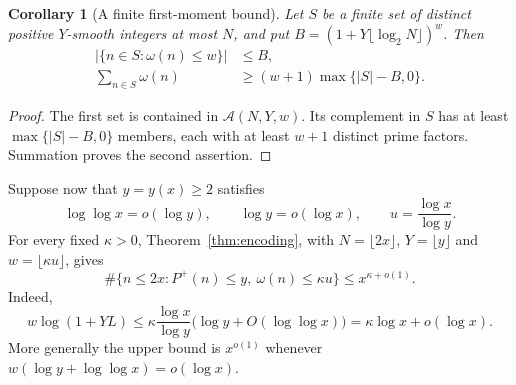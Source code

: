 \documentclass[11pt]{amsart}
\newtheorem{corollary}[theorem]{Corollary}
\theoremstyle{definition}
\theoremstyle{remark}
\newcommand{\loglog}{\log\log}
\begin{document}
\begin{corollary}[A finite first-moment bound]\label{cor:moment}
Let $S$ be a finite set of distinct positive $Y$-smooth integers at most
$N$, and put $B=(1+Y\lfloor\log_2N\rfloor)^w$. Then
\begin{align}
 |\{n\in S:\omega(n)\le w\}|&\le B,\label{eq:lowcount}\\
 \sum_{n\in S}\omega(n)&\ge(w+1)\max\{|S|-B,0\}.
 \label{eq:momentfinite}
\end{align}
\end{corollary}
\begin{proof}
The first set is contained in $\mathcal A(N,Y,w)$. Its complement in $S$
has at least $\max\{|S|-B,0\}$ members, each with at least $w+1$ distinct
prime factors. Summation proves the second assertion.
\end{proof}

Suppose now that $y=y(x)\ge2$ satisfies
\begin{equation}\label{eq:yscale}
 \loglog x=o(\log y),\qquad \log y=o(\log x),
 \qquad u=\frac{\log x}{\log y}.
\end{equation}
For every fixed $\kappa>0$, Theorem~\ref{thm:encoding}, with
$N=\lfloor2x\rfloor$, $Y=\lfloor y\rfloor$ and
$w=\lfloor\kappa u\rfloor$, gives
\begin{equation}\label{eq:global-low}
 \#\{n\le2x:P^+(n)\le y,\ \omega(n)\le\kappa u\}
 \le x^{\kappa+o(1)}.
\end{equation}
Indeed,
\[
 w\log(1+YL)
 \le\kappa\frac{\log x}{\log y}
       \bigl(\log y+O(\loglog x)\bigr)
 =\kappa\log x+o(\log x).
\]
More generally the upper bound is $x^{o(1)}$ whenever
$w(\log y+\loglog x)=o(\log x)$.
\end{document}
